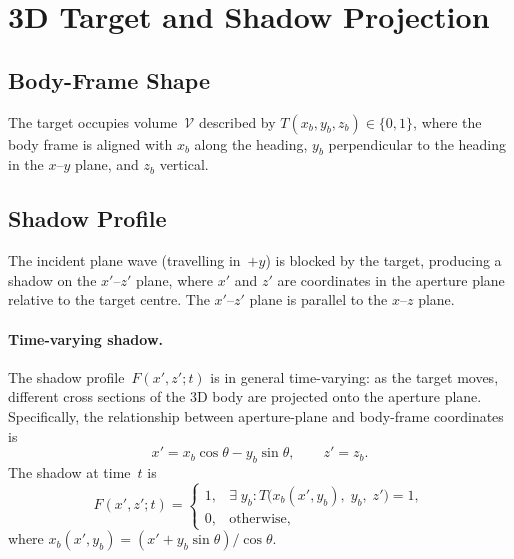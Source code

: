 \documentclass[11pt,a4paper]{article}
\begin{document}
\section{3D Target and Shadow Projection}
\label{sec:shadow}

\subsection{Body-Frame Shape}

The target occupies volume~$\mathcal{V}$ described by
$T(x_b,y_b,z_b)\in\{0,1\}$, where the body frame is aligned with
$x_b$ along the heading, $y_b$ perpendicular to the heading in the
$x$--$y$ plane, and $z_b$ vertical.

\subsection{Shadow Profile}
\label{sec:shadow_profile}

The incident plane wave (travelling in~$+y$) is blocked by the
target, producing a shadow on the $x'$--$z'$ plane, where $x'$ and
$z'$ are coordinates in the aperture plane relative to the target
centre.  The $x'$--$z'$ plane is parallel to the $x$--$z$ plane.

\paragraph{Time-varying shadow.}
The shadow profile~$F(x',z';t)$ is in general time-varying: as the
target moves, different cross sections of the 3D body are projected
onto the aperture plane.  Specifically, the relationship between
aperture-plane and body-frame coordinates is
\begin{equation}
  x' = x_b\cos\theta - y_b\sin\theta, \qquad z' = z_b.
  \label{eq:aperture_body}
\end{equation}
The shadow at time~$t$ is
\begin{equation}
  F(x',z';t) =
  \begin{cases}
    1, & \exists\;y_b: T\!\bigl(x_b(x',y_b),\;y_b,\;z'\bigr)=1,\\
    0, & \text{otherwise},
  \end{cases}
  \label{eq:shadow_profile}
\end{equation}
where $x_b(x',y_b)=(x'+y_b\sin\theta)/\cos\theta$.
\end{document}

